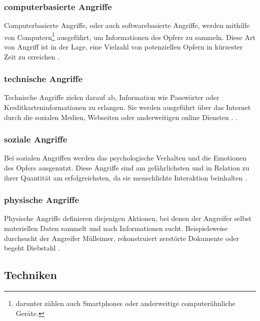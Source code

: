 \subsubsection{computerbasierte Angriffe}
Computerbasierte Angriffe, oder auch softwarebasierte Angriffe, werden mithilfe von Computern\footnote{darunter zählen auch Smartphones oder anderweitige computerähnliche Geräte.}
ausgeführt, um Informationen des Opfers zu sammeln. Diese Art von Angriff ist in der Lage, eine Vielzahl
von potenziellen Opfern in kürzester Zeit zu erreichen .

\subsubsection{technische Angriffe}
\label{technisch}
Technische Angriffe zielen darauf ab, Information wie Passwörter oder Kreditkarteninformationen zu erlangen. Sie werden ausgeführt über das Internet durch die sozialen Medien,
Webseiten oder anderweitigen online Diensten . .

\subsubsection{soziale Angriffe}
\label{sozial}
Bei sozialen Angriffen werden das psychologische Verhalten und die Emotionen des Opfers ausgenutzt. Diese Angriffe sind am gefährlichsten und in Relation zu ihrer Quantität am
erfolgreichsten, da sie menschlichte Interaktion beinhalten .

\subsubsection{physische Angriffe}
Physische Angriffe definieren diejenigen Aktionen, bei denen der Angreifer selbst materiellen Daten sammelt und nach Informationen sucht.
Beispielsweise durchsucht der Angreifer Mülleimer,
rekonstruiert zerstörte Dokumente oder begeht Diebstahl .

\subsection{Techniken}

